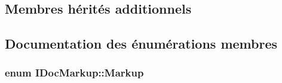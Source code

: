 \subsection*{Membres hérités additionnels}


\subsection{Documentation des énumérations membres}
\hypertarget{class_i_doc_markup_a0f98f192394be48c4fb41b3b79e021ba}{}
\subsubsection[{Markup}]{\setlength{\rightskip}{0pt plus 5cm}enum {\bf I\+Doc\+Markup\+::\+Markup}}\label{class_i_doc_markup_a0f98f192394be48c4fb41b3b79e021ba}
